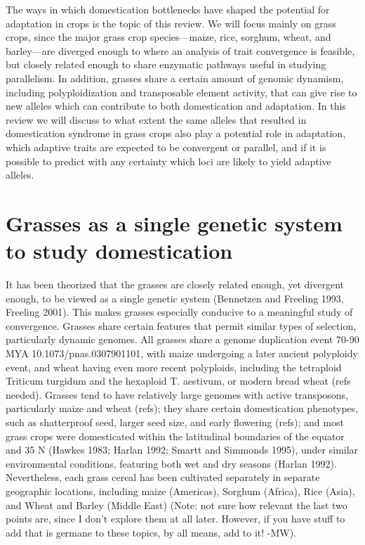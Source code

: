\documentclass[12pt]{article}
\begin{document}
The ways in which domestication bottlenecks have shaped the potential for adaptation in crops is the topic of this review. We will focus mainly on grass crops, since the major grass crop species—maize, rice, sorghum, wheat, and barley—are diverged enough to where an analysis of trait convergence is feasible, but closely related enough to share enzymatic pathways useful in studying parallelism. In addition, grasses share a certain amount of genomic dynamism, including polyploidization and transposable element activity, that can give rise to new alleles which can contribute to both domestication and adaptation.  In this review we will discuss to what extent the same alleles that resulted in domestication syndrome in grass crops also play a potential role in adaptation, which adaptive traits are expected to be convergent or parallel, and if it is possible to predict with any certainty which loci are likely to yield adaptive alleles. \paragraph{}

\section{Grasses as a single genetic system to study domestication}
It has been theorized that the grasses are closely related enough, yet divergent enough, to be viewed as a single genetic system (Bennetzen and Freeling 1993, Freeling 2001). This makes grasses especially conducive to a meaningful study of convergence. Grasses share certain features that permit similar types of selection, particularly dynamic genomes. All grasses share a genome duplication event 70-90 MYA 10.1073/pnas.0307901101, with maize undergoing a later ancient polyploidy event, and wheat having even more recent polyploids, including the tetraploid Triticum turgidum and the hexaploid T. aestivum, or modern bread wheat (refs needed). Grasses tend to  have relatively large genomes with active transposons, particularly maize and wheat (refs); they share certain domestication phenotypes, such as shatterproof seed, larger seed size, and early flowering (refs); and most grass crops were domesticated within the latitudinal boundaries of the equator and 35 N (Hawkes 1983; Harlan 1992; Smartt and Simmonds 1995), under similar environmental conditions, featuring both wet and dry seasons (Harlan 1992).  Nevertheless, each grass cereal has been cultivated separately in separate geographic locations, including maize (Americas), Sorghum (Africa), Rice (Asia), and Wheat and Barley (Middle East) (Note: not sure how relevant the last two points are, since I don't explore them at all later. However, if you have stuff to add that is germane to these topics, by all means, add to it! -MW). \paragraph{}
\end{document}
